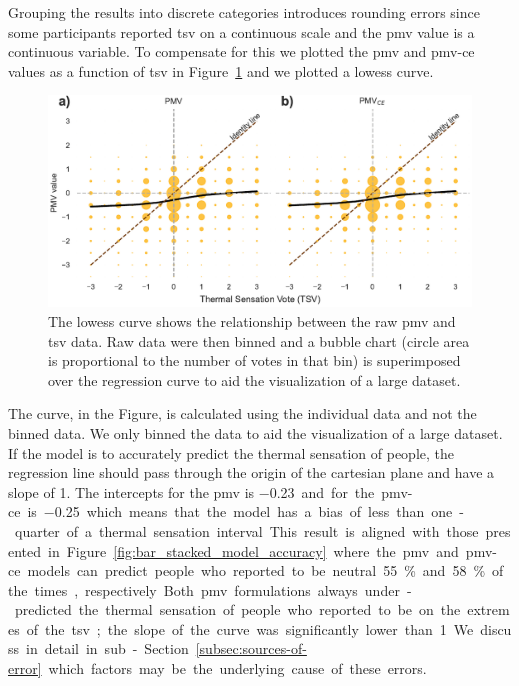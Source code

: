 Grouping the results into discrete categories introduces rounding errors since some participants reported \ac{tsv} on a continuous scale and the \ac{pmv} value is a continuous variable.
To compensate for this we plotted the \ac{pmv} and \ac{pmv-ce} values as a function of \ac{tsv} in Figure~\ref{fig:bubble_models_vs_tsv} and we plotted a \ac{lowess} curve.
\begin{figure}[htb!]
    \centering
    \includegraphics[width=\textwidth]{figures/bubble_models_vs_tsv}
    \caption{The \ac{lowess} curve shows the relationship between the raw \ac{pmv} and \ac{tsv} data.
    Raw data were then binned and a bubble chart (circle area is proportional to the number of votes in that bin) is superimposed over the regression curve to aid the visualization of a large dataset.}
    \label{fig:bubble_models_vs_tsv}
\end{figure}
The curve, in the Figure, is calculated using the individual data and not the binned data.
We only binned the data to aid the visualization of a large dataset.
If the model is to accurately predict the thermal sensation of people, the regression line should pass through the origin of the cartesian plane and have a slope of 1.
The intercepts for the \ac{pmv} is \qty{-0.23} and for the \ac{pmv-ce} is \qty{-0.25} which means that the model has a bias of less than one-quarter of a thermal sensation interval.
This result is aligned with those presented in Figure~\ref{fig:bar_stacked_model_accuracy} where the \ac{pmv} and \ac{pmv-ce} models can predict people who reported to be neutral \qty{55}{\percent} and \qty{58}{\percent} of the times, respectively.
Both \ac{pmv} formulations always under-predicted the thermal sensation of people who reported to be on the extremes of the \ac{tsv};
the slope of the curve was significantly lower than 1.
We discuss in detail in sub-Section~\ref{subsec:sources-of-error} which factors may be the underlying cause of these errors.

